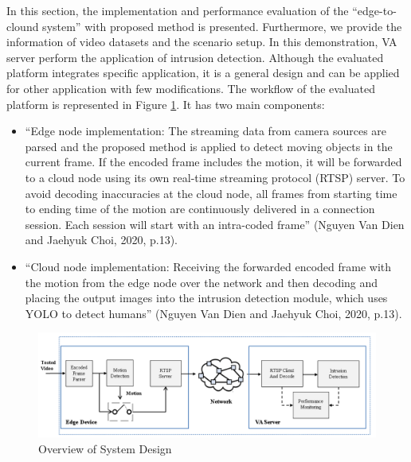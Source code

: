 In this section, the implementation and performance evaluation of the “edge-to-clound system” with proposed method is presented. Furthermore, we provide the information of video datasets and the scenario setup. In this demonstration, VA server perform the application of intrusion detection. Although the evaluated platform integrates specific application, it is a general design and can be applied for other application with few modifications. The workflow of the evaluated platform is represented in Figure \ref{fig:sysdesign}. It has two main components:
\begin{itemize}
\item “Edge node implementation: The streaming data from camera sources are parsed and the proposed method is applied to detect moving objects in the current frame. If the encoded frame includes the motion, it will be forwarded to a cloud node using its own real-time streaming protocol (RTSP) server. To avoid decoding inaccuracies at the cloud node, all frames from starting time to ending time of the motion are continuously delivered in a connection session. Each session will start with an intra-coded frame” (Nguyen Van Dien and Jaehyuk Choi, 2020, p.13).
\item “Cloud node implementation: Receiving the forwarded encoded frame with the motion from the edge node over the network and then decoding and placing the output images into the intrusion detection module, which uses YOLO to detect humans” (Nguyen Van Dien and Jaehyuk Choi, 2020, p.13).
\end{itemize} 
\begin{figure}
\centering
 \includegraphics[width=1.1\linewidth]{Figures/SysDesign.png}
 \caption{Overview of System Design}
 \label{fig:sysdesign}
\end{figure}
